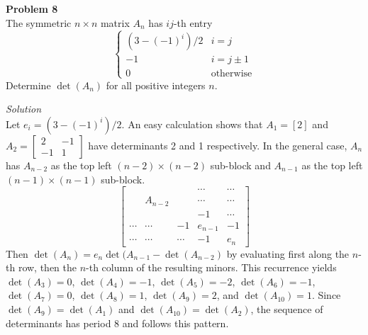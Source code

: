 \documentclass{amsart}
\begin{document}
\pagebreak

\textbf{Problem 8}\\
The symmetric $n \times n$ matrix $A_n$ has $ij$-th entry
\[ \begin{cases} (3 - (-1)^i) / 2 & i = j \\ -1 & i = j \pm 1 \\ 0 & \text{otherwise} \end{cases} \]
Determine $\det(A_n)$ for all positive integers $n$.

\textit{Solution}\\
Let $e_i = (3 - (-1)^i)/2$.
An easy calculation shows that $A_1 = [2]$ and $A_2 = \begin{bmatrix} 2 & -1 \\ -1 & 1 \end{bmatrix}$ have determinants 2 and 1 respectively.
In the general case, $A_n$ has $A_{n - 2}$ as the top left $(n - 2) \times (n - 2)$ sub-block and $A_{n - 1}$ as the top left $(n - 1) \times (n - 1)$ sub-block.
\[ \begin{bmatrix}
& & & \cdots & \cdots \\
& A_{n - 2} & & \cdots & \cdots \\
& & & -1 & \cdots \\
\cdots & \cdots & -1 & e_{n - 1} & -1 \\
\cdots & \cdots & \cdots & -1 & e_n
\end{bmatrix} \]
Then $\det(A_n) = e_n \det(A_{n - 1} - \det(A_{n - 2})$ by evaluating first along the $n$-th row, then the $n$-th column of the resulting minors.
This recurrence yields $\det(A_3) = 0$, $\det(A_4) = -1$, $\det(A_5) = -2$, $\det(A_6) = -1$, $\det(A_7) = 0$, $\det(A_8) = 1$, $\det(A_9) = 2$, and $\det(A_{10}) = 1$.
Since $\det(A_9) = \det(A_1)$ and $\det(A_{10}) = \det(A_2)$, the sequence of determinants has period 8 and follows this pattern.
\end{document}
